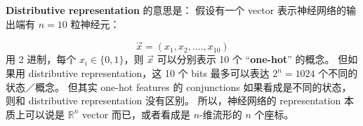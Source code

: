 \documentclass[12pt, orivec]{article}
\newcommand{\cc}[2]{#1}
\newcommand{\cc}[2]{#2}
\begin{document}
\cc{\textbf{Distributive representation} 的意思是： 假设有一个 vector 表示神经网络的输出端有 $n = 10$ 粒神经元：
}{
The meaning of \textbf{Distributive representation} is: Suppose there is a vector indicating that the output of the neural network has $n = 10$ granule neurons:}
\begin{equation}
\vec{x} = (x_1, x_2, .... , x_{10})
\end{equation}
\cc{用 2 进制，每个 $x_i \in \{ 0, 1 \}$，则 $\vec{x}$ 可以分别表示 10 个 ``\textbf{one-hot}'' 的概念。  但如果用 distributive representation，这 10 个 bits 最多可以表达 $2^n = 1024$ 个不同的状态／概念。  但其实 one-hot features 的 conjunctions 如果看成是不同的状态，则和 distributive representation 没有区别。  所以，神经网络的 representation 本质上可以说是 $\mathbb{R}^n$ vector 而已，或者看成是 $n$-维流形的 $n$ 个座标。
}{
In binary, each $x_i \in \{ 0, 1 \}$, $\vec{x}$ can represent the concept of 10 ``\textbf{one-hot}'' respectively. But if you use distributive representation, these 10 bits can express up to $2^n = 1024$ different states/concepts. But in fact, the conjunctions of one-hot features are not different from distributive representations if they are treated as different states. So, the representation of a neural network can be said to be $\mathbb{R}^n$ vector , or as $n$ coordinates of the $n$-dimensional manifold.}
\end{document}
